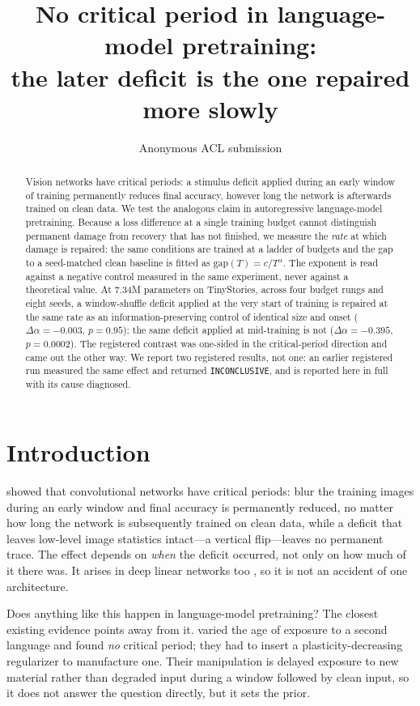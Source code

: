 \documentclass[11pt]{article}
\title{No critical period in language-model pretraining:\\
       the later deficit is the one repaired more slowly}
\author{Anonymous ACL submission}
\newcommand{\cond}[1]{\texttt{#1}}
\begin{document}
\maketitle

\begin{abstract}
Vision networks have critical periods: a stimulus deficit applied during an
early window of training permanently reduces final accuracy, however long the
network is afterwards trained on clean data. We test the analogous claim in
autoregressive language-model pretraining. Because a loss difference at a
single training budget cannot distinguish permanent damage from recovery that
has not finished, we measure the \emph{rate} at which damage is repaired: the
same conditions are trained at a ladder of budgets and the gap to a
seed-matched clean baseline is fitted as $\mathrm{gap}(T) = c/T^{\alpha}$. The
exponent is read against a negative control measured in the same experiment,
never against a theoretical value. At 7.34M parameters on TinyStories, across
four budget rungs and eight seeds, a window-shuffle deficit applied at the very
start of training is repaired at the same rate as an information-preserving
control of identical size and onset ($\Delta\alpha = -0.003$, $p = 0.95$); the
same deficit applied at mid-training is not ($\Delta\alpha = -0.395$,
$p = 0.0002$). The registered contrast was one-sided in the critical-period
direction and came out the other way. We report two registered results, not
one: an earlier registered run measured the same effect and returned
\cond{INCONCLUSIVE}, and is reported here in full with its cause diagnosed.
\end{abstract}

\section{Introduction}

\citet{achille2019critical} showed that convolutional networks have critical
periods: blur the training images during an early window and final accuracy is
permanently reduced, no matter how long the network is subsequently trained on
clean data, while a deficit that leaves low-level image statistics intact---a
vertical flip---leaves no permanent trace. The effect depends on \emph{when} the
deficit occurred, not only on how much of it there was. It arises in deep linear
networks too \citep{kleinman2024critical}, so it is not an accident of one
architecture.

Does anything like this happen in language-model pretraining? The closest
existing evidence points away from it. \citet{constantinescu2025investigating}
varied the age of exposure to a second language and found \emph{no} critical
period; they had to insert a plasticity-decreasing regularizer to manufacture
one. Their manipulation is delayed exposure to new material rather than degraded
input during a window followed by clean input, so it does not answer the question
directly, but it sets the prior.
\end{document}
